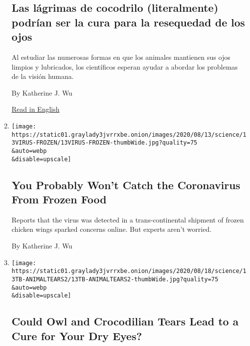 \begin{enumerate}
  \hypertarget{las-luxe1grimas-de-cocodrilo-literalmente-podruxedan-ser-la-cura-para-la-resequedad-de-los-ojos}{%
  \subsection{Las lágrimas de cocodrilo (literalmente) podrían ser la
  cura para la resequedad de los
  ojos}\label{las-luxe1grimas-de-cocodrilo-literalmente-podruxedan-ser-la-cura-para-la-resequedad-de-los-ojos}}

  Al estudiar las numerosas formas en que los animales mantienen sus
  ojos limpios y lubricados, los científicos esperan ayudar a abordar
  los problemas de la visión humana.

  By Katherine J. Wu

  \href{https://www.nytimes3xbfgragh.onion/2020/08/13/science/animal-tears.html}{Read
  in English}
\item
  \href{/2020/08/13/health/coronavirus-frozen-food.html}{}

  \texttt{[image: https://static01.graylady3jvrrxbe.onion/images/2020/08/13/science/13VIRUS-FROZEN/13VIRUS-FROZEN-thumbWide.jpg?quality=75\\\&auto=webp\\\&disable=upscale]}

  \hypertarget{you-probably-wont-catch-the-coronavirus-from-frozen-food}{%
  \subsection{You Probably Won't Catch the Coronavirus From Frozen
  Food}\label{you-probably-wont-catch-the-coronavirus-from-frozen-food}}

  Reports that the virus was detected in a trans-continental shipment of
  frozen chicken wings sparked concerns online. But experts aren't
  worried.

  By Katherine J. Wu
\item
  \href{/2020/08/13/science/animal-tears.html}{}

  \texttt{[image: https://static01.graylady3jvrrxbe.onion/images/2020/08/18/science/13TB-ANIMALTEARS2/13TB-ANIMALTEARS2-thumbWide.jpg?quality=75\\\&auto=webp\\\&disable=upscale]}

  \hypertarget{could-owl-and-crocodilian-tears-lead-to-a-cure-for-your-dry-eyes}{%
  \subsection{Could Owl and Crocodilian Tears Lead to a Cure for Your
  Dry
  Eyes?}\label{could-owl-and-crocodilian-tears-lead-to-a-cure-for-your-dry-eyes}}


\end{enumerate}
